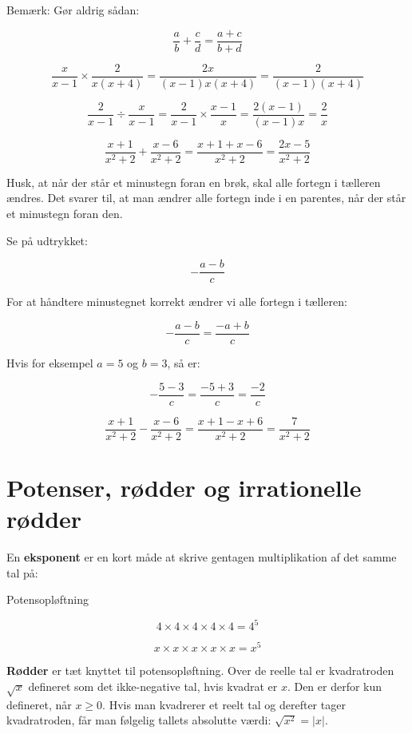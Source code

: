Bemærk: Gør aldrig sådan:

\[
\frac{a}{b} + \frac{c}{d} = \frac{a + c}{b + d}
\]   

\begin{example}

\[
\frac{x}{x - 1} \times \frac{2}{x(x + 4)} = \frac{2x}{(x - 1)x(x + 4)} = \frac{2}{(x - 1)(x + 4)}
\]

\[
\frac{2}{x - 1} \div \frac{x}{x - 1} = \frac{2}{x - 1} \times \frac{x - 1}{x} = \frac{2(x - 1)}{(x - 1)x} = \frac{2}{x}
\]

\[
\frac{x + 1}{x^2 + 2} + \frac{x - 6}{x^2 + 2} = \frac{x + 1 + x - 6}{x^2 + 2} = \frac{2x - 5}{x^2 + 2}
\]    
\end{example}

Husk, at når der står et minustegn foran en brøk, skal alle fortegn i tælleren ændres. Det svarer til, at man ændrer alle fortegn inde i en parentes, når der står et minustegn foran den.

Se på udtrykket:

\[
-\frac{a - b}{c}
\]

For at håndtere minustegnet korrekt ændrer vi alle fortegn i tælleren:

\[
-\frac{a - b}{c} = \frac{-a + b}{c}
\]

Hvis for eksempel \(a = 5\) og \(b = 3\), så er:

\[
-\frac{5 - 3}{c} = \frac{-5 + 3}{c} = \frac{-2}{c}
\]

\begin{example}

\[
\frac{x + 1}{x^2 + 2} - \frac{x - 6}{x^2 + 2} = \frac{x + 1 - x + 6}{x^2 + 2} = \frac{7}{x^2 + 2}
\]    
\end{example}

\section{Potenser, rødder og irrationelle rødder}
En \textbf{eksponent} er en kort måde at skrive gentagen multiplikation af det samme tal på:

\begin{example} Potensopløftning

\[
4 \times 4 \times 4 \times 4 \times 4 = 4^5
\]

\[
x \times x \times x \times x \times x = x^5
\]  
\end{example}

\textbf{Rødder} er tæt knyttet til potensopløftning. Over de reelle tal er kvadratroden \(\sqrt{x}\) defineret som det ikke-negative tal, hvis kvadrat er \(x\). Den er derfor kun defineret, når \(x\geq 0\). Hvis man kvadrerer et reelt tal og derefter tager kvadratroden, får man følgelig tallets absolutte værdi: \(\sqrt{x^2}=|x|\).

